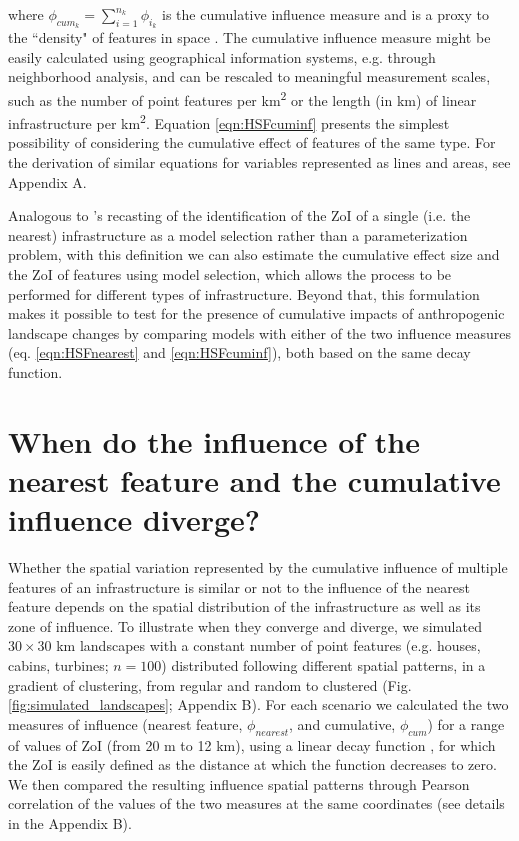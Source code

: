 \documentclass[titlepage]{article}
\begin{document}
where $\phi_{cum_k} = \sum_{i=1}^{n_k} \phi_{i_k}$ is the cumulative influence measure and is a proxy to 
the ``density" of features in space \citep[e.g.][]{panzacchi_searching_2015}. The cumulative influence measure might be easily calculated using geographical information systems, e.g. through neighborhood analysis, and can be rescaled to meaningful measurement scales, such as the number of point features per km\textsuperscript{2} or the length (in km) of linear infrastructure per km\textsuperscript{2}. Equation \ref{eqn:HSFcuminf} presents the simplest possibility of considering the cumulative effect of features of the same type. For the derivation of similar equations for variables represented as lines and areas, see Appendix A.

Analogous to \citet{lee_estimating_2020}'s recasting of the identification of the ZoI of a single (i.e. the nearest) infrastructure as a model selection rather than a parameterization problem, with this definition we can also estimate the cumulative effect size and the ZoI of features using model selection, which allows the process to be performed for different types of infrastructure. Beyond that, this formulation makes it possible to test for the presence of cumulative impacts of anthropogenic landscape changes by comparing models with either of the two influence measures (eq. \ref{eqn:HSFnearest} and \ref{eqn:HSFcuminf}), both based on the same decay function.

\section{When do the influence of the nearest feature and the cumulative influence diverge?}

Whether the spatial variation represented by the cumulative influence of multiple features of an infrastructure is similar or not to the influence of the nearest feature depends on the spatial distribution of the infrastructure as well as its zone of influence. To illustrate when they converge and diverge, we simulated $30 \times 30$ km landscapes with a constant number of point features (e.g. houses, cabins, turbines; $n = 100$) distributed following different spatial patterns, in a gradient of clustering, from regular and random to clustered (Fig. \ref{fig:simulated_landscapes}; Appendix B). For each scenario we calculated the two measures of influence (nearest feature, $\phi_{nearest}$, and cumulative, $\phi_{cum}$) for a range of values of ZoI (from 20 m to 12 km), using a linear decay function \citep[Fig. \ref{fig:zoi_conceptual}; ``Bartlett" or tent-shaped decay;][]{harris_use_1978}, for which the ZoI is easily defined as the distance at which the function decreases to zero. We then compared the resulting influence spatial patterns through Pearson correlation of the values of the two measures at the same coordinates (see details in the Appendix B). 
\end{document}

